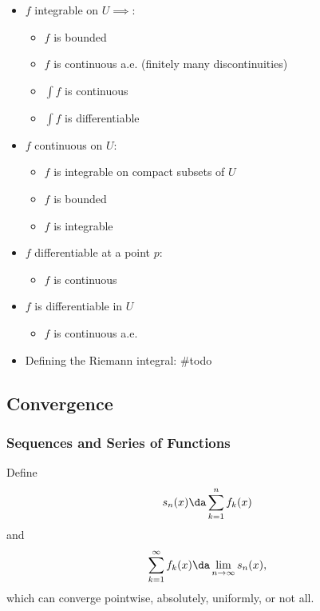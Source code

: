 \begin{itemize}
\tightlist
\item
  \(f\) integrable on \(U \implies\):

  \begin{itemize}
  \tightlist
  \item
    \(f\) is bounded
  \item
    \(f\) is continuous a.e. (finitely many discontinuities)
  \item
    \(\int f\) is continuous
  \item
    \(\int f\) is differentiable
  \end{itemize}
\item
  \(f\) continuous on \(U\):

  \begin{itemize}
  \tightlist
  \item
    \(f\) is integrable on compact subsets of \(U\)
  \item
    \(f\) is bounded
  \item
    \(f\) is integrable
  \end{itemize}
\item
  \(f\) differentiable at a point \(p\):

  \begin{itemize}
  \tightlist
  \item
    \(f\) is continuous
  \end{itemize}
\item
  \(f\) is differentiable in \(U\)

  \begin{itemize}
  \tightlist
  \item
    \(f\) is continuous a.e.
  \end{itemize}
\item
  Defining the Riemann integral: \#todo
\end{itemize}

\hypertarget{convergence-2}{%
\subsection{Convergence}\label{convergence-2}}

\hypertarget{sequences-and-series-of-functions}{%
\subsubsection{Sequences and Series of
Functions}\label{sequences-and-series-of-functions}}

\begin{definition}

Define
\begin{align*}
s_n(x) \da \sum_{k=1}^n f_k(x)
\end{align*} and
\begin{align*}
\sum_{k=1}^\infty f_k(x) \da \lim_{n\to\infty} s_n(x),
\end{align*} which can converge pointwise, absolutely, uniformly, or not
all.

\end{definition}

